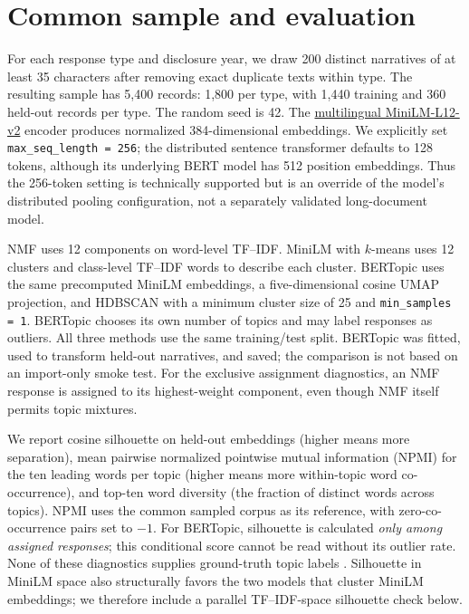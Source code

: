 \documentclass[11pt,a4paper]{article}
\begin{document}
\section{Common sample and evaluation}
For each response type and disclosure year, we draw 200 distinct narratives
of at least 35 characters after removing exact duplicate texts within type.
The resulting sample has 5,400 records: 1,800 per type, with 1,440 training
and 360 held-out records per type. The random seed is 42. The
\href{https://huggingface.co/sentence-transformers/paraphrase-multilingual-MiniLM-L12-v2}{multilingual
MiniLM-L12-v2} encoder produces normalized 384-dimensional embeddings.
We explicitly set \texttt{max\_seq\_length = 256}; the distributed sentence
transformer defaults to 128 tokens, although its underlying BERT model has
512 position embeddings. Thus the 256-token setting is technically supported
but is an override of the model's distributed pooling configuration, not a
separately validated long-document model.

NMF uses 12 components on word-level TF--IDF. MiniLM with $k$-means uses 12
clusters and class-level TF--IDF words to describe each cluster. BERTopic
uses the same precomputed MiniLM embeddings, a five-dimensional cosine UMAP
projection, and HDBSCAN with a minimum cluster size of 25 and
\texttt{min\_samples = 1}. BERTopic chooses its own number of topics and may
label responses as outliers. All three methods use the same training/test
split. BERTopic was fitted, used to transform held-out narratives, and saved;
the comparison is not based on an import-only smoke test.
For the exclusive assignment diagnostics, an NMF response is assigned to its
highest-weight component, even though NMF itself permits topic mixtures.

We report cosine silhouette on held-out embeddings (higher means more
separation), mean pairwise normalized pointwise mutual information (NPMI) for
the ten leading words per topic (higher means more within-topic word
co-occurrence), and top-ten word diversity (the fraction of distinct words
across topics). NPMI uses the common sampled corpus as its reference, with
zero-co-occurrence pairs set to $-1$. For BERTopic, silhouette is calculated
\emph{only among assigned responses}; this conditional score cannot be read
without its outlier rate. None of these diagnostics supplies ground-truth
topic labels \cite{hoyle2021,hoyle2022}. Silhouette in MiniLM space also
structurally favors the two models that cluster MiniLM embeddings; we
therefore include a parallel TF--IDF-space silhouette check below.
\end{document}
